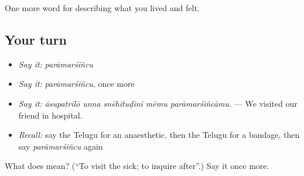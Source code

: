 \begin{grammarlens}[title={What you've built}]
One more word for describing what you lived and felt.
\end{grammarlens}

\subsection*{Your turn}
\begin{itemize}
\raggedright
  \item \emph{Say it:} \emph{parāmarśiñcu}
  \item \emph{Say it:} \emph{parāmarśiñcu}, once more
  \item \emph{Say it:} \emph{āsupatrilō unna snēhituḍini mēmu parāmarśiñcāmu.} — We visited our friend in hospital.
  \item \emph{Recall:} say the Telugu for an anaesthetic, then the Telugu for a bandage, then say \emph{parāmarśiñcu} again
\end{itemize}

\begin{tcolorbox}[breakable,colback=teal!4,colframe=teal!35!black,title={Before you move on}]
What does  mean? (\textquotedblleft{}To visit the sick; to inquire after\textquotedblright{}.) Say it once more.
\end{tcolorbox}

